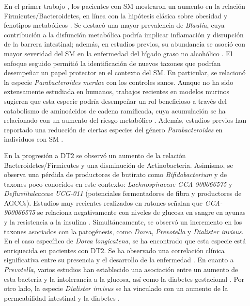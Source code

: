 En el primer trabajo \cite{paper1}, los pacientes con SM mostraron un aumento en la relación Firmicutes/Bacteroidetes, en línea con la hipótesis clásica sobre obesidad y fenotipos metabólicos \cite{santos2019role, baghi2022evaluation}. Se destacó una mayor prevalencia de \textit{Blautia}, cuya contribución a la disfunción metabólica podría implicar inflamación y disrupción de la barrera intestinal; además, en estudios previos, su abundancia se asoció con mayor severidad del SM en la enfermedad del hígado graso no alcohólico \cite{Liu2021, shen2017gut, Wang2016}. El enfoque seguido permitió la identificación de nuevos taxones que podrían desempeñar un papel protector en el contexto del SM. En particular, se relacionó la especie \textit{Parabacteroides merdae} con los controles sanos. Aunque no ha sido extensamente estudiada en humanos, trabajos recientes en modelos murinos sugieren que esta especie podría desempeñar un rol beneficioso a través del catabolismo de aminoácidos de cadena ramificada, cuya acumulación se ha relacionado con un aumento del riesgo metabólico \cite{qiao2022gut}. Además, estudios previos han reportado una reducción de ciertas especies del género \textit{Parabacteroides} en individuos con SM \cite{cui2022roles}.

En la progresión a DT2 se observó un aumento de la relación Bacteroidetes/Firmicutes y una disminución de Actinobacteria. Asimismo, se observa una pérdida de productores de butirato como \textit{Bifidobacterium} \cite{larsen2010gut, wu2010molecular, le2013alterations} y de taxones poco conocidos en este contexto: \textit{Lachnospiraceae GCA-900066575} y \textit{Defluviitaleaceae UCG-011} (potenciales fermentadores de fibra y productores de AGCCs). Estudios muy recientes realizados en ratones señalan que \textit{GCA-900066575} se relaciona negativamente con niveles de glucosa en sangre en ayunas y la resistencia a la insulina \cite{liu2023vitamin}. Simultáneamente, se observó un incremento en los taxones asociados con la patogénesis, como \textit{Dorea}, \textit{Prevotella} y \textit{Dialister invisus}. En el caso específico de \textit{Dorea longicatena}, se ha encontrado que esta especie está enriquecida en pacientes con DT2. Se ha observado una correlación clínica significativa entre su presencia y el desarrollo de la enfermedad \citep{qin2014alterations}. En cuanto a \textit{Prevotella}, varios estudios han establecido una asociación entre un aumento de esta bacteria y la intolerancia a la glucosa, así como la diabetes gestacional \citep{zhang2013human, egshatyan2016gut, hasain2020gut}. Por otro lado, la especie \textit{Dialister invisus} se ha vinculado con un aumento de la permeabilidad intestinal y la diabetes \citep{maffeis2016association, zheng2018gut}.



